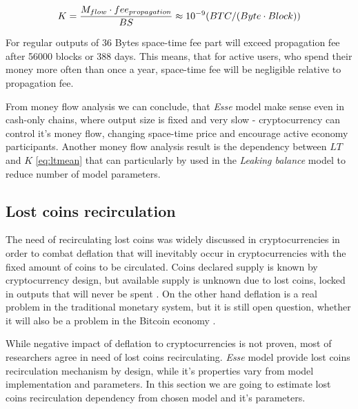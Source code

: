 \documentclass[]{article}   %
\newcommand{\esse}{\textit{Esse}}
\begin{document}
\begin{equation}
K={M_{flow} \cdot fee_{propagation} \over BS} \approx {10^{-9}} ({BTC / (Byte \cdot Block)})
\end{equation}

For regular outputs of 36 Bytes space-time fee part will exceed propagation fee after 56000 blocks or 388 days. This means, that for active users, who spend their money more often than once a year, space-time fee will be negligible relative to propagation fee.

From money flow analysis we can conclude, that \esse{} model make sense even in cash-only chains, where output size is fixed and very slow - cryptocurrency can control it's money flow, changing space-time price and encourage active economy participants. Another money flow analysis result is the dependency between $LT$ and $K$ \ref{eq:ltmean}
 that can particularly by used in the \textit{Leaking balance} model to reduce number of model parameters.


\subsection{Lost coins recirculation}
\label{sec:re}

The need of recirculating lost coins was widely discussed in cryptocurrencies \cite{gjermundrod2014recirculating, gjermundrod2016going} in order to combat deflation that will inevitably occur in cryptocurrencies with the fixed amount of coins to be circulated. Coins declared supply is known by cryptocurrency design, but available supply is unknown due to lost coins, locked in outputs that will never be spent \cite{ron2013quantitative}. On the other hand deflation is a real problem in the traditional monetary system, but it is still open question, whether it will also be a problem in the Bitcoin economy \cite{bitcoinDeflationarySpiral, barber2012bitter}.

While negative impact of deflation to cryptocurrencies is not proven, most of researchers agree in need of lost coins recirculating. \esse{} model provide lost coins recirculation mechanism by design, while it's properties vary from model implementation and parameters. In this section we are going to estimate lost coins recirculation dependency from chosen model and it's parameters.
\end{document}
